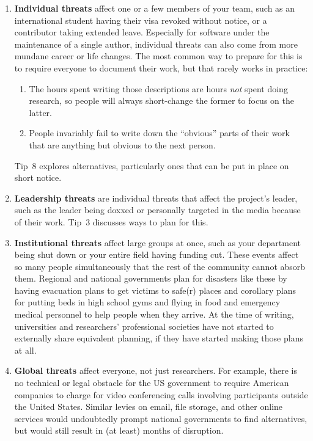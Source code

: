 \documentclass[10pt,letterpaper]{article}
\begin{document}
\begin{enumerate}
\item
  \textbf{Individual threats} affect one or a few members of your team,
  such as an international student having their visa revoked without notice, or a contributor taking extended leave.
  Especially for software under the maintenance of a single author, individual threats can also come from more mundane career or life changes.
  The most common way to prepare for this is to require everyone to document their work, but that rarely works in practice:
  \begin{enumerate}
  \item
    The hours spent writing those descriptions are hours \emph{not} spent doing research,
    so people will always short-change the former to focus on the latter.
  \item
    People invariably fail to write down the ``obvious'' parts of their work
    that are anything but obvious to the next person.
  \end{enumerate}
  Tip~8 explores alternatives,
  particularly ones that can be put in place on short notice.

\item
  \textbf{Leadership threats} are individual threats that affect the project's leader,
  such as the leader being doxxed or personally targeted in the media because of their work.
  Tip~3 discusses ways to plan for this.

\item
  \textbf{Institutional threats} affect large groups at once, such as your department being shut down or your entire field having funding cut.
  These events affect so many people simultaneously that the rest of the community cannot absorb them.
  Regional and national governments plan for disasters like these by having evacuation plans to get victims to safe(r) places
  and corollary plans for putting beds in high school gyms and flying in food and emergency medical personnel to help people when they arrive.
  At the time of writing, universities and researchers' professional societies have not started to externally share equivalent planning, if they have started making those plans at all.

\item
  \textbf{Global threats} affect everyone, not just researchers.
  For example, there is no technical or legal obstacle for the US government to require American companies to charge for video conferencing calls involving participants outside the United States.
  Similar levies on email, file storage, and other online services would undoubtedly prompt national governments to find alternatives,
  but would still result in (at least) months of disruption.

\end{enumerate}
\end{document}
